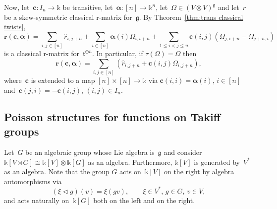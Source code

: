 \documentclass[12pt, reqno]{amsart}
\newcommand{\wh}[1]{\widehat{#1}}
\theoremstyle{definition}
\numberwithin{equation}{section}
\newcommand{\tensor}{\otimes}
\newcommand{\kk}{\mathbb{k}}\newcommand{\lie}[1]{{\mathfrak{#1}}}
\begin{document}
Now, let~$\mathbf c:I_n\to \kk$ be transitive, let~$\boldsymbol{\alpha}:[n]\to \kk^n$, let~$\Omega\in (V\tensor V)^{\lie g}$ and
let~$r$
be a skew-symmetric classical r-matrix for~$\lie g$. By Theorem~\ref{thm:trans classical twists},
$$
\mathbf r(\mathbf c,\boldsymbol{\alpha})=
\sum_{i,j\in [n]} \wh{r}_{i,j+n}+
\sum_{i\in[n]}
\boldsymbol{\alpha}(i) \Omega_{i,i+n}
+\sum_{1\le i<j\le n} \mathbf c(i,j)(\Omega_{j,i+n}-\Omega_{j+n,i})
$$
is a classical r-matrix for~$\lie t^{\oplus n}$. In particular, if
$\tau(\Omega)=\Omega$ then
$$
\mathbf r(\mathbf c,\boldsymbol{\alpha})=\sum_{i,j\in[n]} (\wh{r}_{i,j+n}+\mathbf c(i,j)\Omega_{i,j+n}),
$$
where~$\mathbf c$ is extended to a map $[n]\times[n]\to\kk$ via $\mathbf c(i,i)=\boldsymbol{\alpha}(i)$, $i\in [n]$ and~$\mathbf c(j,i)=-\mathbf c(i,j)$, $(i,j)\in I_n$.

\subsection{Poisson structures for functions on Takiff groups}\label{subs:Poiss Takiff}
Let~$G$ be an algebraic group whose Lie algebra is~$\lie g$ and
consider $\kk[V\rtimes G]\cong \kk[V]\tensor \kk[G]$ 
as an algebra. Furthermore, $\kk[V]$ is generated by~$V^*$ as an algebra. Note that the group $G$ acts on~$\kk[V]$ on the right by algebra automorphisms
via
$$
(\xi\triangleleft g)(v)=\xi(gv),\qquad \xi\in V^*,\,g\in G,\,v\in V,
$$
and acts naturally on~$\kk[G]$ both on the left and on the right.
\end{document}
